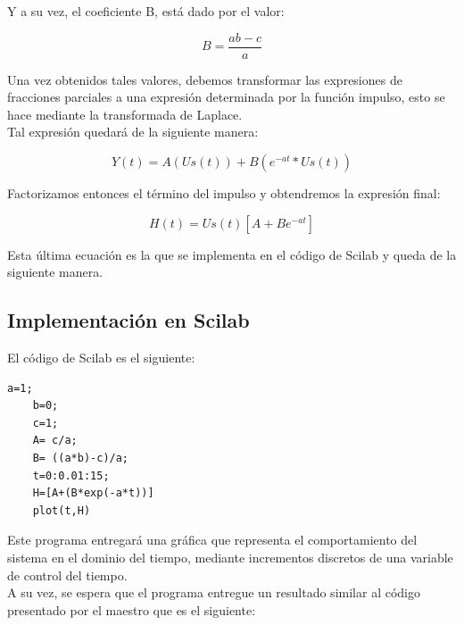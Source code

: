 \documentclass[12pt]{article}
\begin{document}
Y a su vez, el coeficiente B, está dado por el valor:

\begin{equation}
	B = \frac{ab-c}{a}
\end{equation}

Una vez obtenidos tales valores, debemos transformar las expresiones de fracciones parciales a una expresión determinada por la función impulso, esto se hace mediante la transformada de Laplace.\\

Tal expresión quedará de la siguiente manera:

\begin{equation}
	Y(t) = A(Us(t)) + B(e^{-at}*Us(t))
\end{equation}

Factorizamos entonces el término del impulso y obtendremos la expresión final:

\begin{equation}
	H(t) = Us(t)\left[ A + Be^{-at} \right]
\end{equation}

Esta última ecuación es la que se implementa en el código de Scilab y queda de la siguiente manera.

\subsection{Implementación en Scilab}

El código de Scilab es el siguiente:

\begin{lstlisting}[frame=single]    % super cooles Programm
	a=1;
	b=0;
	c=1;
	A= c/a;
	B= ((a*b)-c)/a;
	t=0:0.01:15;
	H=[A+(B*exp(-a*t))]
	plot(t,H)
\end{lstlisting}

Este programa entregará una gráfica que representa el comportamiento del sistema en el dominio del tiempo, mediante incrementos discretos de una variable de control del tiempo.\\

A su vez, se espera que el programa entregue un resultado similar al código presentado por el maestro que es el siguiente:
\end{document}
